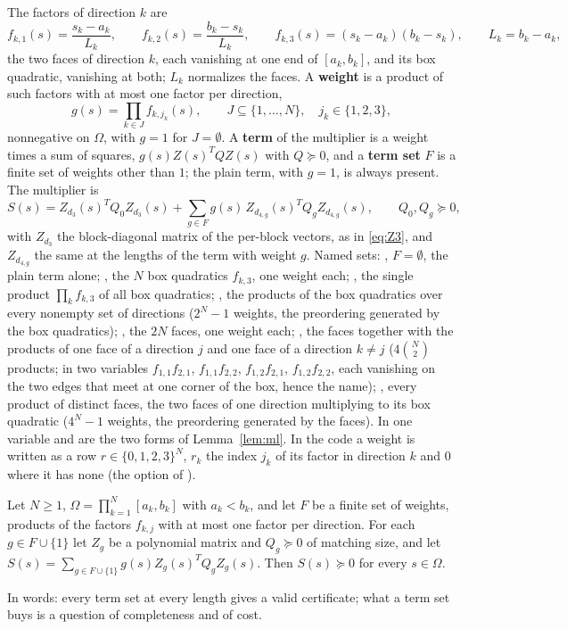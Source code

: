 The factors of direction $k$ are
\[
f_{k,1}(s)=\frac{s_k-a_k}{L_k},\qquad f_{k,2}(s)=\frac{b_k-s_k}{L_k},\qquad f_{k,3}(s)=(s_k-a_k)(b_k-s_k),\qquad L_k=b_k-a_k,
\]
the two faces of direction $k$, each vanishing at one end of $[a_k,b_k]$, and its box quadratic, vanishing at both; $L_k$ normalizes the faces. A \textbf{weight} is a product of such factors with at most one factor per direction,
\[
g(s)=\prod_{k\in J}f_{k,j_k}(s),\qquad J\subseteq\{1,\dots,N\},\quad j_k\in\{1,2,3\},
\]
nonnegative on $\Omega$, with $g=1$ for $J=\emptyset$. A \textbf{term} of the multiplier is a weight times a sum of squares, $g(s)Z(s)^TQZ(s)$ with $Q\succeq0$, and a \textbf{term set} $F$ is a finite set of weights other than $1$; the plain term, with $g=1$, is always present. The multiplier is
\begin{equation}\label{eq:SN}
S(s)=Z_{d_3}(s)^TQ_0Z_{d_3}(s)+\sum_{g\in F}g(s)\,Z_{d_{4,g}}(s)^TQ_gZ_{d_{4,g}}(s),\qquad Q_0,Q_g\succeq0,
\end{equation}
with $Z_{d_3}$ the block-diagonal matrix of the per-block vectors, as in \eqref{eq:Z3}, and $Z_{d_{4,g}}$ the same at the lengths of the term with weight $g$. Named sets: , $F=\emptyset$, the plain term alone; , the $N$ box quadratics $f_{k,3}$, one weight each; , the single product $\prod_kf_{k,3}$ of all box quadratics; , the products of the box quadratics over every nonempty set of directions ($2^N-1$ weights, the preordering generated by the box quadratics); , the $2N$ faces, one weight each; , the faces together with the products of one face of a direction $j$ and one face of a direction $k\ne j$ ($4\binom N2$ products; in two variables $f_{1,1}f_{2,1}$, $f_{1,1}f_{2,2}$, $f_{1,2}f_{2,1}$, $f_{1,2}f_{2,2}$, each vanishing on the two edges that meet at one corner of the box, hence the name); , every product of distinct faces, the two faces of one direction multiplying to its box quadratic ($4^N-1$ weights, the preordering generated by the faces). In one variable  and  are the two forms of Lemma~\ref{lem:ml}. In the code a weight is written as a row $r\in\{0,1,2,3\}^N$, $r_k$ the index $j_k$ of its factor in direction $k$ and $0$ where it has none (the option  of ).

\begin{lemma}[sufficiency]\label{lem:suff}
Let $N\ge1$, $\Omega=\prod_{k=1}^N[a_k,b_k]$ with $a_k<b_k$, and let $F$ be a finite set of weights, products of the factors $f_{k,j}$ with at most one factor per direction. For each $g\in F\cup\{1\}$ let $Z_g$ be a polynomial matrix and $Q_g\succeq0$ of matching size, and let $S(s)=\sum_{g\in F\cup\{1\}}g(s)Z_g(s)^TQ_gZ_g(s)$. Then $S(s)\succeq0$ for every $s\in\Omega$.
\end{lemma}
In words: every term set at every length gives a valid certificate; what a term set buys is a question of completeness and of cost.

